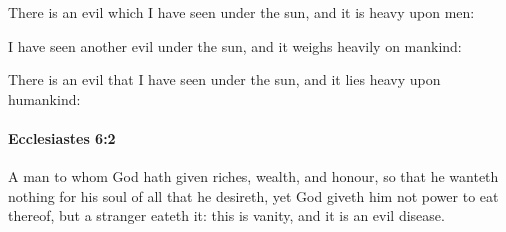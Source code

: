 			\begin{versebox}
					\item[BHS] 
					\item[LXX] 
					\item[ASV] There is an evil which I have seen under the sun, and it is heavy upon men:
					\item[NIV] I have seen another evil under the sun, and it weighs heavily on mankind:
					\item[NRSV] There is an evil that I have seen under the sun, and it lies heavy upon humankind:
			\end{versebox}

		\paragraph{Ecclesiastes 6:2} %
			\label{ECCLESIASTES-6-2}

			A man to whom God hath given riches, wealth, and honour, so that he wanteth nothing for his soul of all that he desireth, yet God giveth him not power to eat thereof, but a stranger eateth it: this is vanity, and it is an evil disease.

